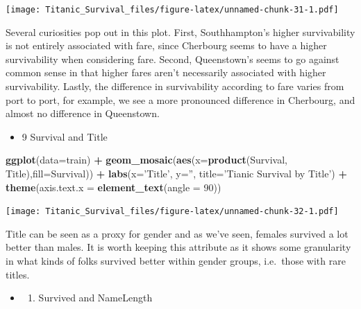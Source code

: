 \documentclass[]{article}
\newenvironment{Shaded}{\begin{snugshade}}{\end{snugshade}}
\newcommand{\KeywordTok}[1]{\textcolor[rgb]{0.13,0.29,0.53}{\textbf{#1}}}
\newcommand{\DataTypeTok}[1]{\textcolor[rgb]{0.13,0.29,0.53}{#1}}
\newcommand{\DecValTok}[1]{\textcolor[rgb]{0.00,0.00,0.81}{#1}}
\newcommand{\StringTok}[1]{\textcolor[rgb]{0.31,0.60,0.02}{#1}}
\newcommand{\OperatorTok}[1]{\textcolor[rgb]{0.81,0.36,0.00}{\textbf{#1}}}
\newcommand{\NormalTok}[1]{#1}
\providecommand{\tightlist}{%
  \setlength{\itemsep}{0pt}\setlength{\parskip}{0pt}}
\begin{document}
\texttt{[image: Titanic\_Survival\_files/figure-latex/unnamed-chunk-31-1.pdf]}

Several curiosities pop out in this plot. First, Southhampton's higher
survivability is not entirely associated with fare, since Cherbourg
seems to have a higher survivability when considering fare. Second,
Queenstown's seems to go against common sense in that higher fares
aren't necessarily associated with higher survivability. Lastly, the
difference in survivability according to fare varies from port to port,
for example, we see a more pronounced difference in Cherbourg, and
almost no difference in Queenstown.

\begin{itemize}
\tightlist
\item
  9 Survival and Title
\end{itemize}

\begin{Shaded}
\begin{Highlighting}[]
\KeywordTok{ggplot}\NormalTok{(}\DataTypeTok{data=}\NormalTok{train) }\OperatorTok{+}
\StringTok{   }\KeywordTok{geom_mosaic}\NormalTok{(}\KeywordTok{aes}\NormalTok{(}\DataTypeTok{x=}\KeywordTok{product}\NormalTok{(Survival, Title),}\DataTypeTok{fill=}\NormalTok{Survival)) }\OperatorTok{+}\StringTok{ }
\StringTok{   }\KeywordTok{labs}\NormalTok{(}\DataTypeTok{x=}\StringTok{'Title'}\NormalTok{, }\DataTypeTok{y=}\StringTok{''}\NormalTok{,}
   \DataTypeTok{title=}\StringTok{'Tianic Survival by Title'}\NormalTok{) }\OperatorTok{+}\StringTok{ }
\StringTok{   }\KeywordTok{theme}\NormalTok{(}\DataTypeTok{axis.text.x =} \KeywordTok{element_text}\NormalTok{(}\DataTypeTok{angle =} \DecValTok{90}\NormalTok{))}
\end{Highlighting}
\end{Shaded}

\texttt{[image: Titanic\_Survival\_files/figure-latex/unnamed-chunk-32-1.pdf]}

Title can be seen as a proxy for gender and as we've seen, females
survived a lot better than males. It is worth keeping this attribute as
it shows some granularity in what kinds of folks survived better within
gender groups, i.e.~those with rare titles.

\begin{itemize}
\item
  \begin{enumerate}
  \def\labelenumi{\arabic{enumi}.}
  \setcounter{enumi}{9}
  \tightlist
  \item
    Survived and NameLength
  \end{enumerate}
\end{itemize}
\end{document}
